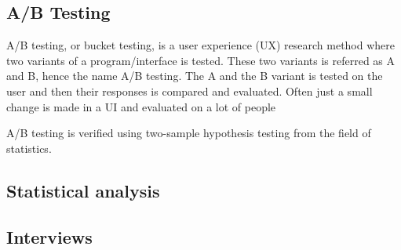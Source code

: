 \subsection{A/B Testing}%
\label{sub:A/B Testing}
A/B testing, or bucket testing, is a user experience (UX) research method where two variants of a program/interface is tested. These two variants is referred as  A and B, hence the name A/B testing. The A and the B variant is tested on the user and then their responses is compared and evaluated. Often just a small change is made in a UI and evaluated on a lot of people 
 

A/B testing is verified using two-sample hypothesis testing from the field of statistics.



\subsection{Statistical analysis}%
\label{sub:Statistical analysis}

\subsection{Interviews}%
\label{sub:Interviews}

